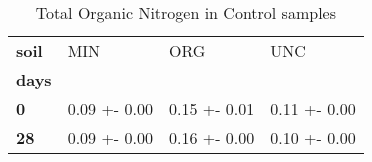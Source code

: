 \begin{table}
\centering
\caption{Total Organic Nitrogen in Control samples}
\label{<built-in method lower of str object at 0x7f389ecd0f80>_treated_main}
\begin{tabular}{llll}
\toprule
\textbf{soil} &           MIN &           ORG &           UNC \\
\textbf{days} &               &               &               \\
\midrule
\textbf{0   } &  0.09 +- 0.00 &  0.15 +- 0.01 &  0.11 +- 0.00 \\
\textbf{28  } &  0.09 +- 0.00 &  0.16 +- 0.00 &  0.10 +- 0.00 \\
\bottomrule
\end{tabular}
\end{table}
